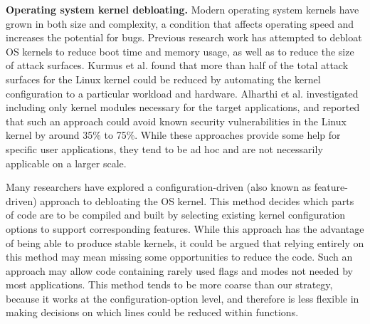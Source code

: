 \textbf{Operating system kernel debloating.} 
Modern operating system kernels have grown in both size and complexity, a condition that affects operating speed and increases the potential for bugs. 
Previous research work \cite{Debloating-Software} has attempted to debloat OS kernels to reduce boot time and memory usage, as well as to reduce the size of attack surfaces. 
Kurmus et al. \cite{NDSS13} found that more than half of the total attack surfaces for the Linux kernel could be reduced by automating the kernel configuration to 
a particular workload and hardware. Alharthi et al. \cite{SALAD18} investigated including only kernel modules necessary for the target applications, 
and reported that such an approach could avoid known security vulnerabilities in the Linux kernel by around 35\% to 75\%. 
While these approaches provide some help for specific user applications, they tend to be ad hoc and are not necessarily applicable on a larger  scale.     

Many researchers \cite{kernel-configuration-17, kernel-tailor-17, kernel-tailor-18, 10.1145/3132747.3132763, 179459, Linux-Kernel-Tailoring-Framework} 
have explored a  configuration-driven (also known as feature-driven) approach to debloating the OS kernel. 
This method decides which parts of code are to be compiled and built by selecting existing kernel configuration options to support corresponding features. 
While this approach has the advantage of being able to produce stable kernels, it could be argued that relying entirely on this method may mean missing some opportunities 
to reduce the code. Such an approach may allow code containing rarely used flags and modes not needed by most applications. 
This method tends to be more coarse than our strategy, because it works at the configuration-option level,  
and therefore is less flexible in making decisions on which lines could be reduced within functions.

